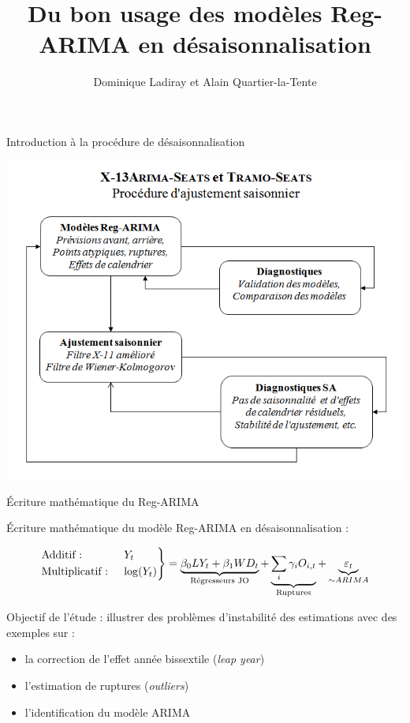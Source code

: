 \documentclass[10pt,xcolor=table,color={dvipsnames,usenames},ignorenonframetext,usepdftitle=false,french]{beamer}
\title{Du bon usage des modèles Reg-ARIMA en désaisonnalisation}
\author{Dominique Ladiray et Alain Quartier-la-Tente}
\date{}
\begin{document}

\begin{frame}{Introduction à la procédure de désaisonnalisation}

\centering
\includegraphics[height = 0.9\textheight]{img/MethodesX13-TS.png}

\end{frame}

\begin{frame}{Écriture mathématique du Reg-ARIMA}

Écriture mathématique du modèle Reg-ARIMA en désaisonnalisation :

\[
 \begin{drcases}
\text{Additif : }& Y_t \\
\text{Multiplicatif : }& \log(Y_t) 
\end{drcases} 
= \underbrace{\beta_0 LY_t + \beta_1 WD_t}_{\text{Régresseurs JO}} + 
\underbrace{\sum_{i}\gamma_iO_{i,t}}_{\mathclap{\text{Ruptures}}} + \underbrace{\varepsilon_t}_{\sim ARIMA}
\]

\medskip

\pause
Objectif de l'étude : illustrer des problèmes d'instabilité des
estimations avec des exemples sur :

\begin{itemize}
\item
  la correction de l'effet année bissextile (\emph{leap year})
\item
  l'estimation de ruptures (\emph{outliers})
\item
  l'identification du modèle ARIMA
\end{itemize}

\end{frame}
\end{document}
